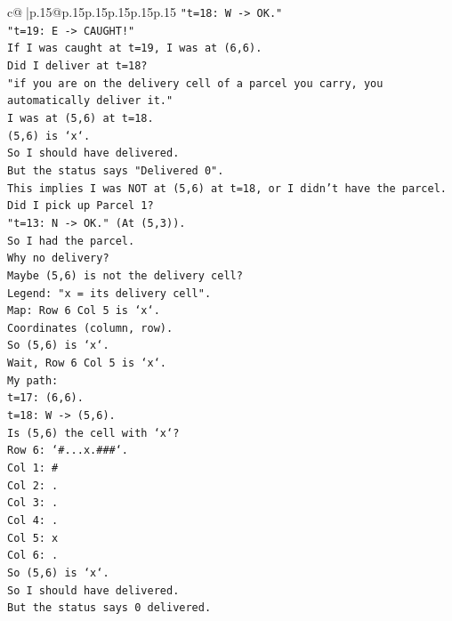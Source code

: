 \documentclass{article}
\begin{document}
{\begin{supertabular}{c@{$\;$}|p{.15\linewidth}@{}p{.15\linewidth}p{.15\linewidth}p{.15\linewidth}p{.15\linewidth}p{.15\linewidth}}
{{{\texttt{"t=18: W {-}> OK."} \\
\texttt{"t=19: E {-}> CAUGHT!"} \\
\texttt{If I was caught at t=19, I was at (6,6).} \\
\texttt{Did I deliver at t=18?} \\
\texttt{"if you are on the delivery cell of a parcel you carry, you automatically deliver it."} \\
\texttt{I was at (5,6) at t=18.} \\
\texttt{(5,6) is `x`.} \\
\texttt{So I should have delivered.} \\
\texttt{But the status says "Delivered 0".} \\
\texttt{This implies I was NOT at (5,6) at t=18, or I didn't have the parcel.} \\
\texttt{Did I pick up Parcel 1?} \\
\texttt{"t=13: N {-}> OK." (At (5,3)).} \\
\texttt{So I had the parcel.} \\
\texttt{Why no delivery?} \\
\texttt{Maybe (5,6) is not the delivery cell?} \\
\texttt{Legend: "x = its delivery cell".} \\
\texttt{Map: Row 6 Col 5 is `x`.} \\
\texttt{Coordinates (column, row).} \\
\texttt{So (5,6) is `x`.} \\
\texttt{Wait, Row 6 Col 5 is `x`.} \\
\texttt{My path:} \\
\texttt{t=17: (6,6).} \\
\texttt{t=18: W {-}> (5,6).} \\
\texttt{Is (5,6) the cell with `x`?} \\
\texttt{Row 6: `\#...x.\#\#\#`.} \\
\texttt{Col 1: \#} \\
\texttt{Col 2: .} \\
\texttt{Col 3: .} \\
\texttt{Col 4: .} \\
\texttt{Col 5: x} \\
\texttt{Col 6: .} \\
\texttt{So (5,6) is `x`.} \\
\texttt{So I should have delivered.} \\
\texttt{But the status says 0 delivered.} \\
}}}
\end{supertabular}}
\end{document}
